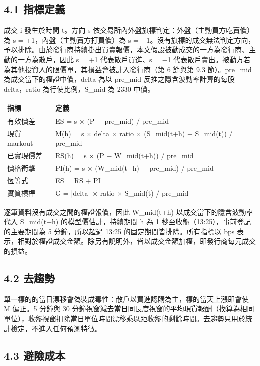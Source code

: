 \documentclass[12pt,a4paper]{article}
\begin{document}
\subsection*{4.1 指標定義}

成交 i 發生於時間 t。方向 s 依交易所內外盤旗標判定：外盤（主動買方吃賣價）為 s = +1，內盤（主動賣方打買價）為 s = −1。沒有旗標的成交無法判定方向，予以排除。由於發行商持續掛出買賣報價，本文假設被動成交的一方為發行商、主動的一方為散戶，因此 s = +1 代表散戶買進、s = −1 代表散戶賣出。被動方若為其他投資人的限價單，其損益會被計入發行商（第 6 節與第 9.3 節）。pre\_mid 為成交當下的權證中價，delta 為以 pre\_mid 反推之隱含波動率計算的每股 delta，ratio 為行使比例，S\_mid 為 2330 中價。

\begin{center}\small
\begin{tabularx}{\linewidth}{lY}
\toprule
\textbf{指標} & \textbf{定義} \\
\midrule
有效價差 & ES = s × (P − pre\_mid) / pre\_mid \\
現貨 markout & M(h) = s × delta × ratio × (S\_mid(t+h) − S\_mid(t)) / pre\_mid \\
已實現價差 & RS(h) = s × (P − W\_mid(t+h)) / pre\_mid \\
價格衝擊 & PI(h) = s × (W\_mid(t+h) − pre\_mid) / pre\_mid \\
恆等式 & ES = RS + PI \\
實質槓桿 & G = |delta| × ratio × S\_mid(t) / pre\_mid \\
\bottomrule
\end{tabularx}
\end{center}

逐筆資料沒有成交之間的權證報價，因此 W\_mid(t+h) 以成交當下的隱含波動率代入 S\_mid(t+h) 的模型價估計，持續期間 h 為 1 秒至收盤（13:25），事前登記的主要期間為 5 分鐘，所以超過 13:25 的固定期間皆排除。所有指標以 bps 表示，相對於權證成交金額。除另有說明外，皆以成交金額加權，即發行商每元成交的損益。

\subsection*{4.2 去趨勢}

單一標的的當日漂移會偽裝成毒性：散戶以買進認購為主，標的當天上漲即會使 M 偏正。5 分鐘與 30 分鐘視窗減去當日同長度視窗的平均現貨報酬（換算為相同單位），收盤視窗扣除當日單位時間漂移乘以距收盤的剩餘時間。去趨勢只用於統計檢定，不進入任何預測特徵。

\subsection*{4.3 避險成本}
\end{document}
